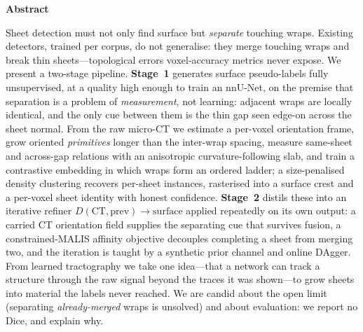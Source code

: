\documentclass[10pt,twocolumn,a4paper]{article}
\begin{document}

{\small
\begin{center}\textbf{Abstract}\end{center}
\noindent
Sheet detection must not only find surface but \emph{separate} touching wraps.
Existing detectors, trained per corpus, do not generalise: they merge touching
wraps and break thin sheets---topological errors voxel-accuracy metrics never
expose. We present a two-stage pipeline. \textbf{Stage~1} generates surface
pseudo-labels fully unsupervised, at a quality high enough to train an nnU-Net,
on the premise that separation is a problem of \emph{measurement}, not learning:
adjacent wraps are locally identical, and the only cue between them is the thin
gap seen edge-on across the sheet normal. From the raw micro-CT we estimate a
per-voxel orientation frame, grow oriented \emph{primitives} longer than the
inter-wrap spacing, measure same-sheet and across-gap relations with an
anisotropic curvature-following slab, and train a contrastive embedding in which
wraps form an ordered ladder; a size-penalised density clustering recovers
per-sheet instances, rasterised into a surface crest and a per-voxel sheet
identity with honest confidence. \textbf{Stage~2} distils these into an iterative
refiner $D(\mathrm{CT},\mathrm{prev})\!\to\!\mathrm{surface}$ applied repeatedly on
its own output: a carried CT orientation field supplies the separating cue that
survives fusion, a constrained-MALIS affinity objective decouples completing a
sheet from merging two, and the iteration is taught by a synthetic prior channel
and online DAgger. From learned tractography we take one idea---that a network can
track a structure through the raw signal beyond the traces it was shown---to grow
sheets into material the labels never reached. We are candid about the open limit
(separating \emph{already-merged} wraps is unsolved) and about evaluation: we
report no Dice, and explain why.
\par}
\end{document}
